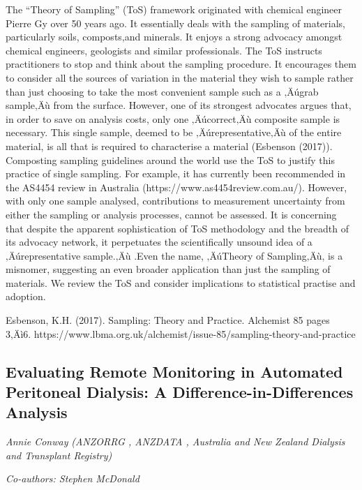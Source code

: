 \documentclass[
]{scrreprt}
\begin{document}
The ``Theory of Sampling'' (ToS) framework originated with chemical
engineer Pierre Gy over 50 years ago. It essentially deals with the
sampling of materials, particularly soils, composts,and minerals. It
enjoys a strong advocacy amongst chemical engineers, geologists and
similar professionals. The ToS instructs practitioners to stop and think
about the sampling procedure. It encourages them to consider all the
sources of variation in the material they wish to sample rather than
just choosing to take the most convenient sample such as a ‚Äúgrab
sample‚Äù from the surface. However, one of its strongest advocates
argues that, in order to save on analysis costs, only one ‚Äúcorrect‚Äù
composite sample is necessary. This single sample, deemed to be
‚Äúrepresentative‚Äù of the entire material, is all that is required to
characterise a material (Esbenson (2017)). Composting sampling
guidelines around the world use the ToS to justify this practice of
single sampling. For example, it has currently been recommended in the
AS4454 review in Australia (https://www.as4454review.com.au/). However,
with only one sample analysed, contributions to measurement uncertainty
from either the sampling or analysis processes, cannot be assessed. It
is concerning that despite the apparent sophistication of ToS
methodology and the breadth of its advocacy network, it perpetuates the
scientifically unsound idea of a ‚Äúrepresentative sample.‚Äù .Even the
name, ‚ÄúTheory of Sampling‚Äù, is a misnomer, suggesting an even
broader application than just the sampling of materials. We review the
ToS and consider implications to statistical practise and adoption.

Esbenson, K.H. (2017). Sampling: Theory and Practice. Alchemist 85 pages
3‚Äì6.
https://www.lbma.org.uk/alchemist/issue-85/sampling-theory-and-practice

\subsection{Evaluating Remote Monitoring in Automated Peritoneal
Dialysis: A Difference-in-Differences
Analysis}\label{evaluating-remote-monitoring-in-automated-peritoneal-dialysis-a-difference-in-differences-analysis}

\emph{Annie Conway} \emph{(ANZORRG , ANZDATA ,
Australia and New Zealand Dialysis and Transplant Registry)}

\emph{Co-authors: Stephen McDonald}

\setlength{\parskip}{0.5em}
\end{document}
